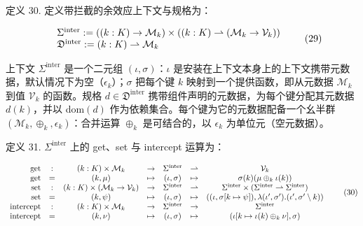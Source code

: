 定义 30. 定义带拦截的余效应上下文与规格为：

\[
\begin{array} { r l } & { \Sigma ^ { \mathrm { i n t e r } } : = ( ( k : K ) \to \mathcal { M } _ { k } ) \times ( ( k : K ) \rightharpoonup ( \mathcal { M } _ { k } \to \mathcal { V } _ { k } ) ) } \\ & { \mathfrak { D } ^ { \mathrm { i n t e r } } : = ( k : K ) \rightharpoonup \mathcal { M } _ { k } } \end{array}\tag{29}
\]

上下文 \(\Sigma ^ { \mathrm { i n t e r } }\) 是一个二元组 \(( \iota , \sigma )\)：\(\iota\) 是安装在上下文本身上的上下文携带元数据，默认情况下为空（\(\epsilon _ { k }\)）；\(\sigma\) 把每个键 \(k\) 映射到一个提供函数，即从元数据 \(\mathcal { M } _ { k }\) 到值 \(\mathcal { V } _ { k }\) 的函数。规格 \(d \in \mathfrak { D } ^ { \mathrm { i n t e r } }\) 携带组件声明的元数据，为每个键分配其元数据 \(d ( k )\)，并以 dom\(( d )\) 作为依赖集合。每个键为它的元数据配备一个幺半群 \(( \mathcal { M } _ { k } , \oplus _ { k } , \epsilon _ { k } )\)：合并运算 \(\oplus _ { k }\) 是可结合的，以 \(\epsilon _ { k }\) 为单位元（空元数据）。

定义 31. \(\Sigma ^ { \mathrm { i n t e r } }\) 上的 get、set 与 intercept 运算为：

\[
\begin{array} { r c c c c c c } { \mathrm { g e t } } & { : } & { ( k : K ) \times \mathcal { M } _ { k } } & { \to } & { \Sigma ^ { \mathrm { i n t e r } } } & { \rightharpoonup } & { \mathcal { V } _ { k } } \\ { \mathrm { g e t } } & { = } & { ( k , \mu ) } & { \mapsto } & { ( \iota , \sigma ) } & { \mapsto } & { \sigma ( k ) ( \mu \oplus _ { k } \iota ( k ) ) } \\ { \mathrm { s e t } } & { : } & { ( k : K ) \times ( \mathcal { M } _ { k } \to \mathcal { V } _ { k } ) } & { \to } & { \Sigma ^ { \mathrm { i n t e r } } } & { \rightharpoonup } & { \Sigma ^ { \mathrm { i n t e r } } \times ( \Sigma ^ { \mathrm { i n t e r } } \rightharpoonup \Sigma ^ { \mathrm { i n t e r } } ) } \\ { \mathrm { s e t } } & { = } & { ( k , \psi ) } & { \mapsto } & { ( \iota , \sigma ) } & { \mapsto } & { ( ( \iota , \sigma [ k \mapsto \psi ] ) , \lambda ( \iota ^ { \prime } , \sigma ^ { \prime } ) . ( \iota ^ { \prime } , \sigma ^ { \prime } \setminus k ) ) } \\ { \mathrm { i n t e r c e p t } } & { : } & { ( k : K ) \times \mathcal { M } _ { k } } & { \to } & { \Sigma ^ { \mathrm { i n t e r } } } & { \to } & { \Sigma ^ { \mathrm { i n t e r } } } \\ { \mathrm { i n t e r c e p t } } & { = } & { ( k , \nu ) } & { \mapsto } & { ( \iota , \sigma ) } & { \mapsto } & { ( \iota [ k \mapsto \iota ( k ) \oplus _ { k } \nu ] , \sigma ) } \end{array}\tag{30}
\]

